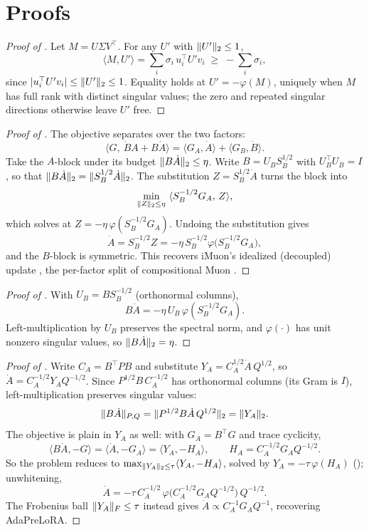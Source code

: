 \documentclass[11pt]{article}
\DeclarePairedDelimiter{\norm}{\lVert}{\rVert}
\newcommand{\polar}{\varphi}                 %
\theoremstyle{plain}
\theoremstyle{definition}
\theoremstyle{remark}
\begin{document}
\appendix
\section{Proofs}
\label{app:proofs}

\begin{proof}[Proof of ]
Let $M=U\Sigma V^\top$. For any $U'$ with $\norm{U'}_2\le1$,
\[
  \langle M,U'\rangle=\sum_i\sigma_i\,u_i^\top U' v_i \;\ge\; -\sum_i\sigma_i,
\]
since $|u_i^\top U' v_i|\le\norm{U'}_2\le1$. Equality holds at $U'=-\polar(M)$, uniquely when $M$ has full rank with distinct singular values; the zero and repeated singular directions otherwise leave $U'$ free.
\end{proof}

\begin{proof}[Proof of ]
The objective separates over the two factors:
\[
  \langle G,\ \dot B A+B\dot A\rangle=\langle G_A,\dot A\rangle+\langle G_B,\dot B\rangle .
\]
Take the $A$-block under its budget $\norm{B\dot A}_2\le\eta$. Write $B=U_B S_B^{1/2}$ with $U_B^\top U_B=I$, so that $\norm{B\dot A}_2=\norm{S_B^{1/2}\dot A}_2$. The substitution $Z=S_B^{1/2}\dot A$ turns the block into
\[
  \min_{\norm{Z}_2\le\eta}\ \langle S_B^{-1/2}G_A,\,Z\rangle,
\]
which  solves at $Z=-\eta\,\polar(S_B^{-1/2}G_A)$. Undoing the substitution gives
\[
  \dot A=S_B^{-1/2}Z=-\eta\,S_B^{-1/2}\polar\!\big(S_B^{-1/2}G_A\big),
\]
and the $B$-block is symmetric. This recovers iMuon's idealized (decoupled) update \cite{imuon}, the per-factor split of compositional Muon \cite{tilde_csd}.
\end{proof}

\begin{proof}[Proof of ]
With $U_B=BS_B^{-1/2}$ (orthonormal columns),
\[
  B\dot A=-\eta\,U_B\,\polar(S_B^{-1/2}G_A).
\]
Left-multiplication by $U_B$ preserves the spectral norm, and $\polar(\cdot)$ has unit nonzero singular values, so $\norm{B\dot A}_2=\eta$.
\end{proof}

\begin{proof}[Proof of ]
Write $C_A=B^\top P B$ and substitute $Y_A=C_A^{1/2}\dot A\,Q^{1/2}$, so $\dot A=C_A^{-1/2}Y_A Q^{-1/2}$. Since $P^{1/2}B\,C_A^{-1/2}$ has orthonormal columns (its Gram is $I$), left-multiplication preserves singular values:
\[
  \norm{B\dot A}_{P,Q}=\norm{P^{1/2}B\dot A\,Q^{1/2}}_2=\norm{Y_A}_2 .
\]
The objective is plain in $Y_A$ as well: with $G_A=B^\top G$ and trace cyclicity,
\[
  \langle B\dot A,-G\rangle=\langle\dot A,-G_A\rangle=\langle Y_A,-H_A\rangle,\qquad H_A=C_A^{-1/2}G_A Q^{-1/2}.
\]
So the problem reduces to $\max_{\norm{Y_A}_2\le\tau}\langle Y_A,-H_A\rangle$, solved by $Y_A=-\tau\,\polar(H_A)$ (); unwhitening,
\[
  \dot A=-\tau\,C_A^{-1/2}\,\polar\!\big(C_A^{-1/2}G_A Q^{-1/2}\big)\,Q^{-1/2}.
\]
The Frobenius ball $\norm{Y_A}_F\le\tau$ instead gives $\dot A\propto C_A^{-1}G_A Q^{-1}$, recovering AdaPreLoRA.
\end{proof}
\end{document}
